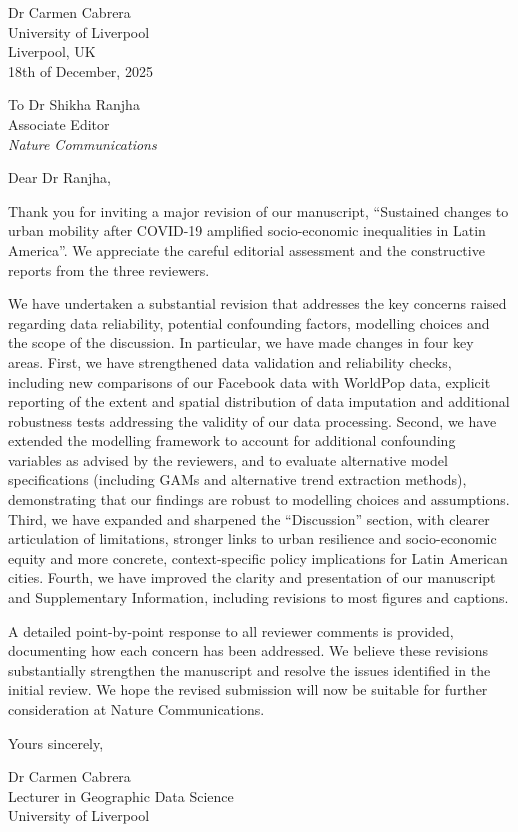 \documentclass[fleqn,10pt]{letter}
\begin{document}
\begin{flushright}
Dr Carmen Cabrera\\
University of Liverpool\\
Liverpool, UK\\
18th of December, 2025\\
\end{flushright}

\begin{flushleft}
To Dr Shikha Ranjha \\
Associate Editor \\
\textit{Nature Communications} \\
\end{flushleft} 

Dear Dr Ranjha,

Thank you for inviting a major revision of our manuscript, ``Sustained changes to urban mobility after COVID-19 amplified socio-economic inequalities in Latin America''. We appreciate the careful editorial assessment and the constructive reports from the three reviewers.

We have undertaken a substantial revision that addresses the key concerns raised regarding data reliability, potential confounding factors, modelling choices and the scope of the discussion. In particular, we have made changes in four key areas. First, we have strengthened data validation and reliability checks, including new comparisons of our Facebook data with WorldPop data, explicit reporting of the extent and spatial distribution of data imputation and additional robustness tests addressing the validity of our data processing. Second, we have extended the modelling framework to account for additional confounding variables as advised by the reviewers, and to evaluate alternative model specifications (including GAMs and alternative trend extraction methods), demonstrating that our findings are robust to modelling choices and assumptions. Third, we have expanded and sharpened the ``Discussion'' section, with clearer articulation of limitations, stronger links to urban resilience and socio-economic equity and more concrete, context-specific policy implications for Latin American cities. Fourth, we have improved the clarity and presentation of our manuscript and Supplementary Information, including revisions to most figures and captions.

A detailed point-by-point response to all reviewer comments is provided, documenting how each concern has been addressed. We believe these revisions substantially strengthen the manuscript and resolve the issues identified in the initial review. We hope the revised submission will now be suitable for further consideration at Nature Communications.

Yours sincerely,

Dr Carmen Cabrera\\
Lecturer in Geographic Data Science\\
University of Liverpool
\end{document}
